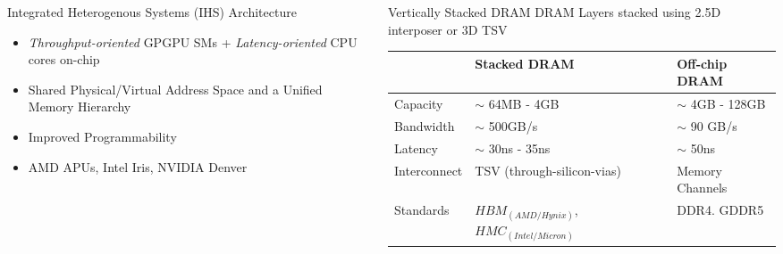 \documentclass[final,t]{beamer}
\begin{document}
\begin{frame}[t,fragile]{}
\begin{tcolorbox}[colback=red!5!white,
                      colframe=red!75!black,
                     ]
\begin{columns}[t]
\begin{column}{.48\linewidth}
\begin{exampleblock}{Integrated Heterogenous Systems (IHS) Architecture}
        	\begin{itemize}
    	    	\item \textit{Throughput-oriented} GPGPU SMs + \textit{Latency-oriented} CPU cores on-chip
       			\item Shared Physical/Virtual Address Space and a Unified Memory Hierarchy 
    	    	\item Improved Programmability
    			\item AMD APUs, Intel Iris, NVIDIA Denver
    	        \end{itemize}    
    		\begin{figure}
    			\centering
    			\def\svgwidth{0.7\linewidth}
    			 
    		\end{figure}
            \end{exampleblock}
     \end{column}
     \begin{column}{.48\linewidth}
        \begin{exampleblock}{Vertically Stacked DRAM}
            	\centering DRAM Layers stacked using 2.5D interposer or 3D TSV
\vspace{1.5em}
\begin{table}[]
\centering
\setlength{\tabcolsep}{1em}
\begin{tabular}{lll}
             & \textbf{Stacked DRAM}                                                     & \textbf{Off-chip DRAM} \\
             \hline
Capacity     & $\sim$ 64MB - 4GB                                                         & $\sim$ 4GB - 128GB     \\
Bandwidth    & $\sim$ 500GB/s                                                            & $\sim$ 90 GB/s         \\
Latency      & $\sim$ 30ns - 35ns                                                        & $\sim$ 50ns            \\
Interconnect & TSV (through-silicon-vias)                                                & Memory Channels        \\
Standards    & $HBM_{(AMD/Hynix)}$, $HMC_{(Intel/Micron)}$ & DDR4. GDDR5           
\end{tabular}
\end{table}
\vspace{0.9em}
            		\begin{figure}
            			\centering
            			\def\svgwidth{0.62\linewidth}
            			 
            		\end{figure}
        \end{exampleblock}
      \end{column}
      \end{columns}
    \end{tcolorbox}


\end{frame}
\end{document}
